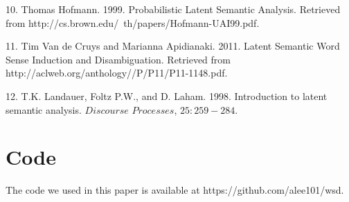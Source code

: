 \documentclass[10pt, letterpaper]{article}
\begin{document}
	10. Thomas Hofmann. 1999. Probabilistic Latent Semantic Analysis. Retrieved from http://cs.brown.edu/~th/papers/Hofmann-UAI99.pdf.

	11. Tim Van de Cruys and Marianna Apidianaki. 2011. Latent Semantic Word Sense Induction and Disambiguation. Retrieved from http://aclweb.org/anthology//P/P11/P11-1148.pdf. 

	12. T.K. Landauer, Foltz P.W., and D. Laham. 1998. Introduction to latent semantic analysis. $\textit{Discourse Processes}$, $25:259-284$. 
 

	\section{Code}

	The code we used in this paper is available at https://github.com/alee101/wsd. 


 
\end{document}

